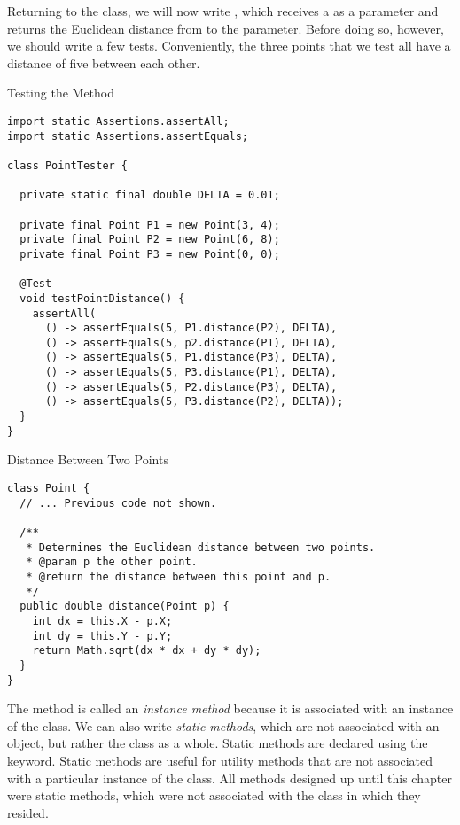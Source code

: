 Returning to the  class, we will now write , which receives a  as a parameter and returns the Euclidean distance from  to the parameter. Before doing so, however, we should write a few tests. Conveniently, the three points that we test all have a distance of five between each other.

\begin{cl}[]{Testing the  Method}
\begin{lstlisting}[language=MyJava]
import static Assertions.assertAll;
import static Assertions.assertEquals;

class PointTester {

  private static final double DELTA = 0.01;

  private final Point P1 = new Point(3, 4);
  private final Point P2 = new Point(6, 8);
  private final Point P3 = new Point(0, 0);

  @Test
  void testPointDistance() {
    assertAll(
      () -> assertEquals(5, P1.distance(P2), DELTA),
      () -> assertEquals(5, p2.distance(P1), DELTA),
      () -> assertEquals(5, P1.distance(P3), DELTA),
      () -> assertEquals(5, P3.distance(P1), DELTA),
      () -> assertEquals(5, P2.distance(P3), DELTA),
      () -> assertEquals(5, P3.distance(P2), DELTA));
  }
}
\end{lstlisting}
\end{cl}

\begin{cl}[]{Distance Between Two Points}
\begin{lstlisting}[language=MyJava]
class Point {
  // ... Previous code not shown.

  /**
   * Determines the Euclidean distance between two points.
   * @param p the other point.
   * @return the distance between this point and p.
   */
  public double distance(Point p) {
    int dx = this.X - p.X;
    int dy = this.Y - p.Y;
    return Math.sqrt(dx * dx + dy * dy);
  }
}
\end{lstlisting}
\end{cl}

The  method is called an \emph{instance method} because it is associated with an instance of the class. We can also write \emph{static methods}, which are not associated with an object, but rather the class as a whole. Static methods are declared using the  keyword. Static methods are useful for utility methods that are not associated with a particular instance of the class. All methods designed up until this chapter were static methods, which were not associated with the class in which they resided.

